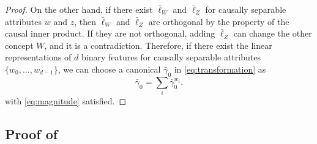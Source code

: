 \documentclass{article}
\begin{document}
\begin{proof}
  On the other hand, if there exist $\bar\ell_W$ and $\bar\ell_Z$ for causally separable attributes $w$ and $z$, then $\bar\ell_W$ and $\bar\ell_Z$ are orthogonal by the property of the causal inner product.
  If they are not orthogonal, adding $\bar\ell_Z$ can change the other concept $W$, and it is a contradiction.
  Therefore, if there exist the linear representations of $d$ binary features for causally separable attributes $\{w_0, \dots, w_{d-1}\}$, we can choose a canonical $\bar\gamma_0$ in \cref{eq:transformation} as
  \begin{equation}
    \bar\gamma_0 = \sum_i \bar{\gamma}_0^{w_i}.
  \end{equation}
  with \cref{eq:magnitude} satisfied.
\end{proof}


\subsection{Proof of }
\Orthogonality*
\end{document}
